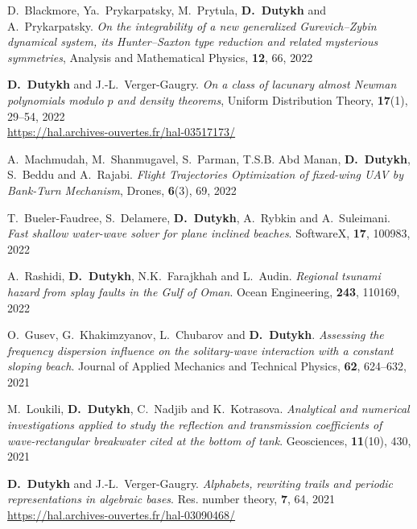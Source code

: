 \begin{etaremune}
  \item D.~Blackmore, Ya.~Prykarpatsky, M.~Prytula, \textbf{D.~Dutykh} and A.~Prykarpatsky. \textit{On the integrability of a new generalized Gurevich--Zybin dynamical system, its Hunter--Saxton type reduction and related mysterious symmetries}, Analysis and Mathematical Physics, \textbf{12}, 66, 2022 %
  
  \item \textbf{D.~Dutykh} and J.-L.~Verger-Gaugry. \textit{On a class of lacunary almost Newman polynomials modulo $p$ and density theorems}, Uniform Distribution Theory, \textbf{17}(1), 29--54, 2022 \\ %
  \url{https://hal.archives-ouvertes.fr/hal-03517173/}
  
  \item A.~Machmudah, M.~Shanmugavel, S.~Parman, T.S.B. Abd Manan, \textbf{D.~Dutykh}, S.~Beddu and A.~Rajabi. \textit{Flight Trajectories Optimization of fixed-wing UAV by Bank-Turn Mechanism}, Drones, \textbf{6}(3), 69, 2022 %
  
  \item T.~Bueler-Faudree, S.~Delamere, \textbf{D.~Dutykh}, A.~Rybkin and A.~Suleimani. \textit{Fast shallow water-wave solver for plane inclined beaches}. SoftwareX, \textbf{17}, 100983, 2022 %
  
  \item A.~Rashidi, \textbf{D.~Dutykh}, N.K.~Farajkhah and L.~Audin. \textit{Regional tsunami hazard from splay faults in the Gulf of Oman}. Ocean Engineering, \textbf{243}, 110169, 2022 %

  
  \item O.~Gusev, G.~Khakimzyanov, L.~Chubarov and \textbf{D.~Dutykh}. \textit{Assessing the frequency dispersion influence on the solitary-wave interaction with a constant sloping beach}. Journal of Applied Mechanics and Technical Physics, \textbf{62}, 624--632, 2021 %
  
  \item M.~Loukili, \textbf{D.~Dutykh}, C.~Nadjib and K.~Kotrasova. \textit{Analytical and numerical investigations applied to study the reflection and transmission coefficients of wave-rectangular breakwater cited at the bottom of tank}. Geosciences, \textbf{11}(10), 430, 2021 %
  
  \item \textbf{D.~Dutykh} and J.-L.~Verger-Gaugry. \textit{Alphabets, rewriting trails and periodic representations in algebraic bases}. Res. number theory, \textbf{7}, 64, 2021 \\ %
  \url{https://hal.archives-ouvertes.fr/hal-03090468/}
  

\end{etaremune}
